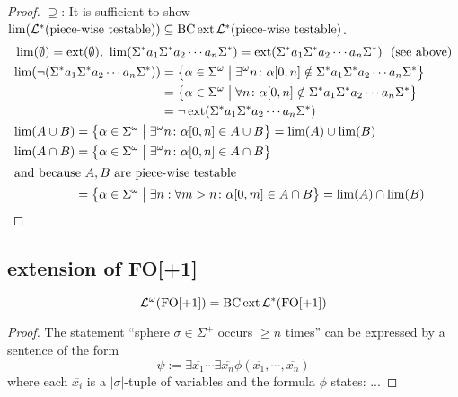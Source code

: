\begin{proof}
$\supseteq$: It is sufficient to show $\lim(\mathcal{L}^* (\textup{\textrm{piece-wise testable}})) \subseteq \operatorname{BC} \operatorname{ext} \mathcal{L}^* (\textup{\textrm{piece-wise testable}})$.
\begin{align*}
& \lim(\emptyset) = \ext(\emptyset), \ \lim(\Sigma^* a_1 \Sigma^* a_2 \dotsb a_n \Sigma^*) = \ext(\Sigma^* a_1 \Sigma^* a_2 \dotsb a_n \Sigma^*) \ \ \text{(see above)} \\
& \begin{aligned}
\lim( \neg ( \Sigma^* a_1 \Sigma^* a_2 \dotsb a_n \Sigma^* ) ) & = \Set{ \alpha \in \Sigma^\omega }{ \exists^\omega n \colon \alpha [0,n] \notin \Sigma^* a_1 \Sigma^* a_2 \dotsb a_n \Sigma^* } \\
& = \Set{ \alpha \in \Sigma^\omega }{ \forall n \colon \alpha [0,n] \notin \Sigma^* a_1 \Sigma^* a_2 \dotsb a_n \Sigma^* } \\
& = \neg \ext( \Sigma^* a_1 \Sigma^* a_2 \dotsb a_n \Sigma^* )
\end{aligned} \\
& \begin{aligned}
\lim(A \cup B) & = \Set{ \alpha \in \Sigma^\omega }{ \exists^\omega n \colon \alpha[0,n] \in A \cup B } = \lim(A) \cup \lim(B) \\
\lim(A \cap B) & = \Set{ \alpha \in \Sigma^\omega }{ \exists^\omega n \colon \alpha[0,n] \in A \cap B } \\
\intertext{and because $A,B$ are piece-wise testable}
& = \Set{ \alpha \in \Sigma^\omega }{ \exists n : \forall m > n \colon \alpha[0,m] \in A \cap B } = \lim(A) \cap \lim(B)
\end{aligned}
\end{align*}

\end{proof}


\subsection{extension of FO[+1]}

\begin{thm}
\[ \mathcal{L}^\omega (\mathrm{FO[+1]}) = \operatorname{BC} \operatorname{ext} \mathcal{L}^*(\mathrm{FO[+1]}) \]
\end{thm}

\begin{proof}
The statement ``sphere $\sigma \in \Sigma^+$ occurs $\geq n$ times'' can be expressed by a sentence of the form
\[ \psi := \exists \overline{x_1} \dotsb \exists \overline{x_n} \phi(\overline{x_1}, \dotsb, \overline{x_n}) \]
where each $\overline{x_i}$ is a $|\sigma|$-tuple of variables and the formula $\phi$ states:
...
\end{proof}


